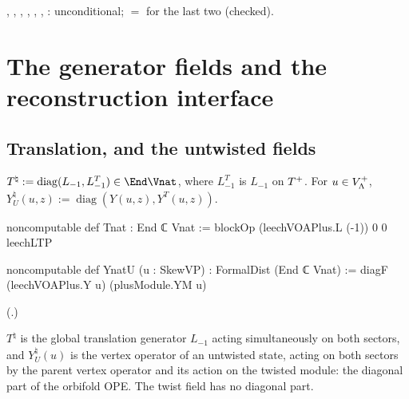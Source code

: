 \begin{status}
, , , ,
, , :
unconditional;  $=$  for the last
two (checked).
\end{status}

\section{The generator fields and the reconstruction interface}\label{ch10:sec:fields}

\subsection{Translation, and the untwisted fields}

\begin{definition}\label{ch10:def:Tnat}
$T^\natural:=\operatorname{diag}(L_{-1},L_{-1}^{T})\in\End\Vnat$, where $L^T_{-1}$ is $L_{-1}$ on
$T^{+}$.  For $u\in V_{\Lambda}^{+}$, $Y^\natural_U(u,z):=\operatorname{diag}(Y(u,z),Y^T(u,z))$.
\end{definition}
\begin{leancode}
noncomputable def Tnat : End ℂ Vnat := blockOp (leechVOAPlus.L (-1)) 0 0 leechLTP

noncomputable def YnatU (u : SkewVP) : FormalDist (End ℂ Vnat) :=
  diagF (leechVOAPlus.Y u) (plusModule.YM u)
\end{leancode}
(.)

\begin{physics}
$T^\natural$ is the global translation generator $L_{-1}$ acting simultaneously on both sectors, and $Y^\natural_U(u)$ is the vertex operator of an untwisted state, acting on both sectors by the parent vertex operator and its action on the twisted module: the diagonal part of the orbifold OPE. The twist field has no diagonal part.
\end{physics}

